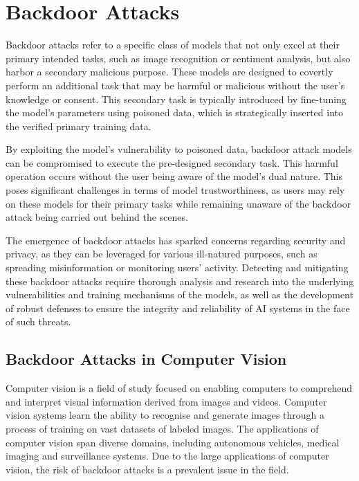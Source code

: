 \chapter{Backdoor Attacks}

Backdoor attacks refer to a specific class of models that not only excel at their primary intended tasks, such as image recognition or sentiment analysis, but also harbor a secondary malicious purpose. These models are designed to covertly perform an additional task that may be harmful or malicious without the user's knowledge or consent. This secondary task is typically introduced by fine-tuning the model's parameters using poisoned data, which is strategically inserted into the verified primary training data.

By exploiting the model's vulnerability to poisoned data, backdoor attack models can be compromised to execute the pre-designed secondary task. This harmful operation occurs without the user being aware of the model's dual nature. This poses significant challenges in terms of model trustworthiness, as users may rely on these models for their primary tasks while remaining unaware of the backdoor attack being carried out behind the scenes.

The emergence of backdoor attacks has sparked concerns regarding security and privacy, as they can be leveraged for various ill-natured purposes, such as spreading misinformation or monitoring users' activity. Detecting and mitigating these backdoor attacks require thorough analysis and research into the underlying vulnerabilities and training mechanisms of the models, as well as the development of robust defenses to ensure the integrity and reliability of AI systems in the face of such threats.

\section{Backdoor Attacks in Computer Vision}

Computer vision is a field of study focused on enabling computers to comprehend and interpret visual information derived from images and videos. Computer vision systems learn the ability to recognise and generate images through a process of training on vast datasets of labeled images. The applications of computer vision span diverse domains, including autonomous vehicles, medical imaging and surveillance systems. Due to the large applications of computer vision, the risk of backdoor attacks is a prevalent issue in the field.

